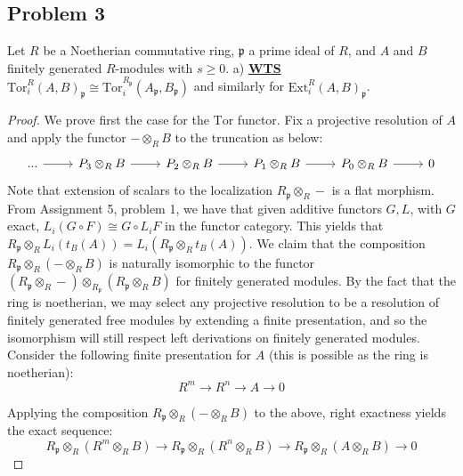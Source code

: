 \documentclass{article}
\newcommand{\Tor}{\text{Tor}}
\newcommand{\Ext}{\text{Ext}}
\newcommand{\fk}[1]{\mathfrak{#1}}
\newcommand{\iso}{\cong}
\begin{document}
\vspace{0.3in}
\subsection*{Problem 3}
Let $R$ be a Noetherian commutative ring, $\fk{p}$ a prime ideal of $R$, and $A$ and $B$ finitely generated $R$-modules with $s \geq 0$. 
\newpage
a) \textbf{\underline{WTS}} $\text{Tor}_{i}^{R}(A,B)_{\fk{p}} \iso \text{Tor}_{i}^{R_{\fk{p}}}(A_{\fk{p}}, B_{\fk{p}})$ and similarly for $\Ext_{i}^{R}(A,B)_{\fk{p}}$.
\begin{proof}
  We prove first the case for the $\Tor$ functor. Fix a projective resolution of $A$ and apply the functor $- \otimes_{R} B$ to the truncation as below:
  \[
    \begin{tikzcd}
... \arrow[r] & P_3\otimes_{R}B \arrow[r] & P_2\otimes_{R}B \arrow[r] & P_1\otimes_{R}B \arrow[r] & P_0\otimes_{R}B \arrow[r] & 0
\end{tikzcd}
\]
Note that extension of scalars to the localization $R_{\fk{p}} \otimes_{R} - $ is a flat morphism. From Assignment 5, problem 1, we have that given additive functors $G,L$, with $G$ exact, $L_{i}(G \circ F) \iso G \circ L_{i}F$ in the functor category. This yields that $R_{\fk{p}}\otimes_{R}L_{i}(t_{B}(A)) = L_{i}(R_{\fk{p}}\otimes_{R}t_{B}(A))$. 
We claim that the composition $R_{\fk{p}} \otimes_{R} ( - \otimes_{R}B)$ is naturally isomorphic to the functor $(R_{\fk{p}} \otimes_{R} - ) \otimes_{R_{\fk{p}}} (R_{\fk{p}} \otimes_{R} B)$ for finitely generated modules. By the fact that the ring is noetherian, we may select any projective resolution to be a resolution of finitely generated free modules by extending a finite presentation, and so the isomorphism will still respect left derivations on finitely generated modules. Consider the following finite presentation for $A$ (this is possible as the ring is noetherian):
\[
  R^{m} \to R^{n} \to A \to 0
\]

Applying the composition $R_{\fk{p}} \otimes_{R} ( - \otimes_{R}B)$ to the above, right exactness yields the exact sequence:
\[
  R_{\fk{p}} \otimes_{R} ( R^{m} \otimes_{R}B) \to R_{\fk{p}} \otimes_{R} ( R^{n} \otimes_{R}B) \to R_{\fk{p}} \otimes_{R} ( A \otimes_{R}B) \to 0
\]


\end{proof}
\end{document}
